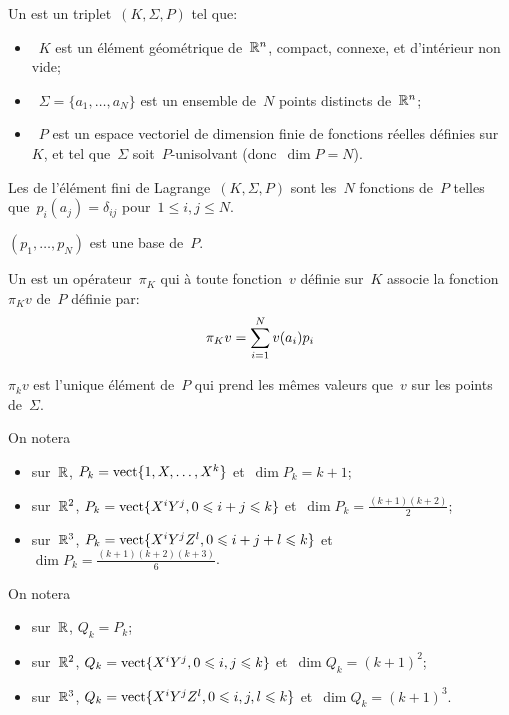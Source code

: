 \begin{definition}
Un  est un triplet~$(K, \Sigma, P)$ tel que:
\begin{itemize}
\item~$K$ est un élément géométrique de~$\mathbb R^n$, compact, connexe, et d'intérieur
	non vide;
\item~$\Sigma=\{a_1,\ldots, a_N\}$ est un ensemble de~$N$ points distincts de~$\mathbb R^n$;
\item~$P$ est un espace vectoriel de dimension finie de fonctions réelles définies sur~$K$, et tel
	que~$\Sigma$ soit~$P$-unisolvant (donc~$\dim P = N$).
\end{itemize}
\end{definition}
\medskip
Les  de l'élément fini de Lagrange~$(K, \Sigma, P)$ sont les~$N$ fonctions de~$P$ telles que~$p_i(a_j)=\delta_{ij}$ pour~$1\le i,j\le N$.
\medskip
\begin{remarque}$(p_1,\ldots, p_N)$ est une base de~$P$.\end{remarque}
\medskip
\begin{definition}
Un  est un opérateur~$\pi_K$ qui à toute fonction~$v$ définie sur~$K$ associe la fonction~$\pi_Kv$ de~$P$ définie par: \begin{equation}\pi_Kv=\displaystyle\sum_{i=1}^N v(a_i)p_i\end{equation}
\end{definition}
\begin{theoreme}
$\pi_kv$ est l'unique élément de~$P$ qui prend les mêmes valeurs que~$v$ sur les points de~$\Sigma$.
\end{theoreme}
\medskip
On notera 
\begin{itemize}
\item sur~$\mathbb R$, $P_k=\operatorname{vect}\{1, X,\ldots, X^k\}$ et~$\dim P_k=k+1$;
\item sur~$\mathbb R^2$, $P_k=\operatorname{vect}\{X^iY^j, 0\leqslant i+j\leqslant k\}$ et~$\dim P_k=\frac{(k+1)(k+2)}2$;
\item sur~$\mathbb R^3$, $P_k=\operatorname{vect}\{X^iY^jZ^l, 0\leqslant i+j+l\leqslant k\}$ et~$\dim P_k=\frac{(k+1)(k+2)(k+3)}6$.
\end{itemize}
\medskip
On notera 
\begin{itemize}
\item sur~$\mathbb R$, $Q_k=P_k$;
\item sur~$\mathbb R^2$, $Q_k=\operatorname{vect}\{X^iY^j, 0\leqslant i,j\leqslant k\}$ et~$\dim Q_k=(k+1)^2$;
\item sur~$\mathbb R^3$, $Q_k=\operatorname{vect}\{X^iY^jZ^l, 0\leqslant i,j,l\leqslant k\}$ et~$\dim Q_k=(k+1)^3$.
\end{itemize}



